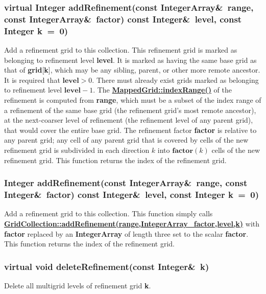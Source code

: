 \documentclass{article}
\begin{document}
  \subsubsection{virtual Integer addRefinement(const IntegerArray\&~range, const IntegerArray\&~factor)
     const Integer\&~level, const Integer k~=~0)}
  \label{GridCollection::addRefinement(range,IntegerArray_factor,level,k)}
    Add a refinement grid to this collection.  This refinement grid is marked as belonging to refinement level \textbf{level}.
    It is marked as having the same base grid as that of \textbf{grid}[\textbf{k}], which may be any sibling, parent, or
    other more remote ancestor.  It is required that $\textbf{level}>0$.  There must already exist grids marked as belonging
    to refinement level $\textbf{level}-1$.
    The {\bf{}\hyperref{indexRange()}{indexRange() \rm(\S}{)}{MappedGrid::indexRange()}} of the refinement is computed from \textbf{range},
    which must be a subset of the index range of a refinement of the same base grid (the refinement grid's most remote ancestor),
    at the next-coarser level of refinement (the refinement level of any parent grid), that would cover the entire base grid.
    The refinement factor \textbf{factor} is relative to any parent grid; any cell of any parent grid that is covered by cells
    of the new refinement grid is subdivided in each direction $k$ into $\textbf{factor}(k)$ cells of the new refinement grid.
    This function returns the index of the refinement grid.

  \subsubsection{Integer addRefinement(const IntegerArray\&~range, const Integer\&~factor)
     const Integer\&~level, const Integer k~=~0)}
  \label{GridCollection::addRefinement(range,Integer_factor,level,k)}
    Add a refinement grid to this collection.  This function simply calls
    {\bf{}\hyperref{addRefinement()}{addRefinement() \rm(\S}{)}{GridCollection::addRefinement(range,IntegerArray_factor,level,k)}}
    with \textbf{factor} replaced by an \textbf{IntegerArray} of length three set to the scalar \textbf{factor}.
    This function returns the index of the refinement grid.

  \subsubsection{virtual void deleteRefinement(const Integer\&~k)}
  \label{GridCollection::deleteRefinement(k)}
    Delete all multigrid levels of refinement grid \textbf{k}.
\end{document}
